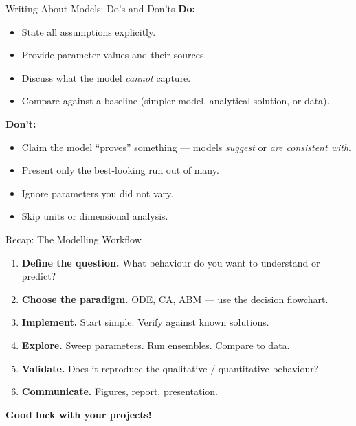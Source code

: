 \begin{frame}{Writing About Models: Do's and Don'ts}
  \textbf{Do:}
  \begin{itemize}
    \item State all assumptions explicitly.
    \item Provide parameter values and their sources.
    \item Discuss what the model \emph{cannot} capture.
    \item Compare against a baseline (simpler model, analytical solution, or data).
  \end{itemize}
  \medskip
  \textbf{Don't:}
  \begin{itemize}
    \item Claim the model ``proves'' something --- models \emph{suggest} or \emph{are consistent with}.
    \item Present only the best-looking run out of many.
    \item Ignore parameters you did not vary.
    \item Skip units or dimensional analysis.
  \end{itemize}
\end{frame}


\begin{frame}{Recap: The Modelling Workflow}
  \begin{enumerate}
    \item \textbf{Define the question.} What behaviour do you want to understand or predict?
    \item \textbf{Choose the paradigm.} ODE, CA, ABM --- use the decision flowchart.
    \item \textbf{Implement.} Start simple. Verify against known solutions.
    \item \textbf{Explore.} Sweep parameters. Run ensembles. Compare to data.
    \item \textbf{Validate.} Does it reproduce the qualitative / quantitative behaviour?
    \item \textbf{Communicate.} Figures, report, presentation.
  \end{enumerate}
  \medskip
  \begin{center}
    \textbf{Good luck with your projects!}
  \end{center}
\end{frame}
